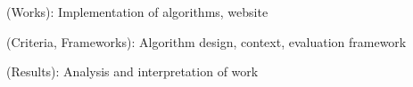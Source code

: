 \begin{description}[leftmargin=2.7cm]
  \item [Practice] (Works): Implementation of algorithms, website
  \item [Theory] (Criteria, Frameworks): Algorithm design, context, evaluation framework
  \item [Evaluation] (Results): Analysis and interpretation of work
\end{description}


\stopcontents[chapters]
